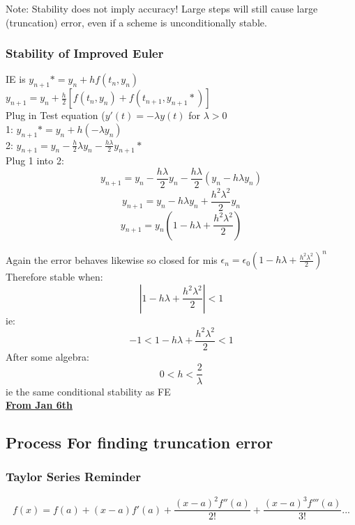 \documentclass[12pt]{article}
\newcommand{\myt}[1]{\textbf{\underline{#1}}}
\begin{document}
	Note: Stability does not imply accuracy! Large steps will still cause large (truncation) error, even if a scheme is unconditionally stable.\\
	
	\subsubsection*{Stability of Improved Euler}
	IE is $y_{n+1}* = y_n + hf(t_n,y_n)$\\
	$y_{n+1} = y_n + \frac{h}{2}[f(t_n, y_n) + f(t_{n+1}, y_{n+1}*)]$\\
	Plug in Test equation ($y'(t) = -\lambda y(t)$ for $\lambda > 0$\\
	1: $y_{n+1}* = y_n + h(-\lambda y_n)$\\
	2: $y_{n+1} = y_n - \frac{h}{2}\lambda y_n - \frac{h\lambda}{2}y_{n+1}*$\\
	
	Plug 1 into 2:\\
	$$y_{n+1} = y_n - \frac{h\lambda}{2}y_n - \frac{h\lambda}{2}(y_n - h\lambda y_n)$$
	$$y_{n+1} = y_n - h\lambda y_n + \frac{h^2\lambda^2}{2}y_n$$
	$$y_{n+1} = y_n(1-h\lambda + \frac{h^2\lambda^2}{2})$$
	
	Again the error behaves likewise so closed for mis $\epsilon_n = \epsilon_0(1-h\lambda + \frac{h^2\lambda^2}{2})^n$\\
	
	Therefore stable when:\\
	$$|1-h\lambda + \frac{h^2\lambda^2}{2} | < 1$$
	ie:\\
	$$-1 < 1-h\lambda+ \frac{h^2\lambda^2}{2} < 1$$
	After some algebra:\\
	$$0 < h < \frac{2}{\lambda}$$
	ie the same conditional stability as FE\\
	
	\myt{From Jan 6th}\\
	
	\subsection*{Process For finding truncation error}
	\subsubsection*{Taylor Series Reminder}
	$$f(x) = f(a) + (x-a)f'(a) + \frac{(x-a)^2f''(a)}{2!} + \frac{(x-a)^3f'''(a)}{3!} ...$$
	
\end{document}
